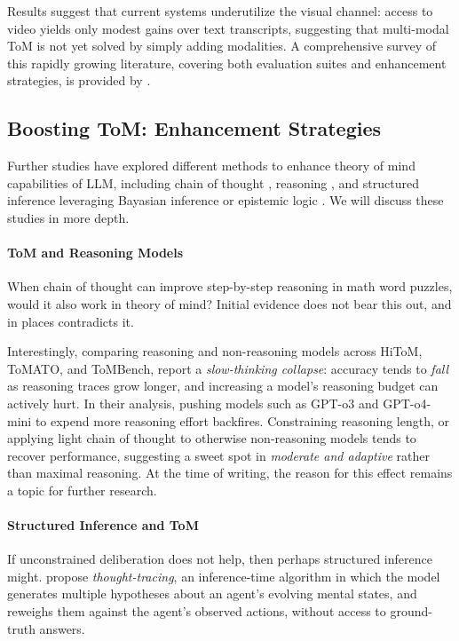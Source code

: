 Results suggest that current systems underutilize the visual channel: access to video yields only modest gains over text transcripts, suggesting that multi-modal ToM is not yet solved by simply adding modalities. A comprehensive survey of this rapidly growing literature, covering both evaluation suites and enhancement strategies, is provided by \citet{chen-etal-2025-theory}.

\subsection{Boosting ToM: Enhancement Strategies} \label{sec:enhancement}
Further studies have explored different methods to enhance theory of mind capabilities of LLM,  including chain of thought \citep{moghaddam2023boostingtheoryofmindperformancelarge}, reasoning \citep{kim2025hypothesis}, and structured inference leveraging Bayasian inference \citep{jin2024mmtomqamultimodaltheorymind} or epistemic logic \citep{wuDELToMInferenceTimeScaling2025a}. We will discuss these studies in more depth. 

\paragraph{ToM and Reasoning Models} \label{sec:tomreasoning}
When chain of thought can improve step-by-step reasoning in math word puzzles, would it also work in  theory of mind? Initial  evidence does not bear this out, and in places contradicts it. 

Interestingly, comparing reasoning and non-reasoning models across HiToM, ToMATO, and ToMBench, \citet{gong2026think} report a {\em slow-thinking collapse}: accuracy tends to \emph{fall} as reasoning traces grow longer, and increasing a model's reasoning budget can actively hurt. In their analysis, pushing models such as GPT-o3 and GPT-o4-mini to expend more reasoning effort backfires. Constraining reasoning length, or applying light chain of thought to otherwise non-reasoning models tends to recover performance, suggesting a sweet spot in \emph{moderate and adaptive} rather than maximal reasoning. At the time of writing, the reason for this effect remains a topic for further research.

\paragraph{Structured Inference and ToM} 
If unconstrained deliberation does not help, then perhaps structured inference might. \citet{kim2025hypothesis} propose \emph{thought-tracing}, an inference-time algorithm  in which the model generates multiple hypotheses about an agent's evolving mental states, and reweighs them against the agent's observed actions, without access to ground-truth answers. 

